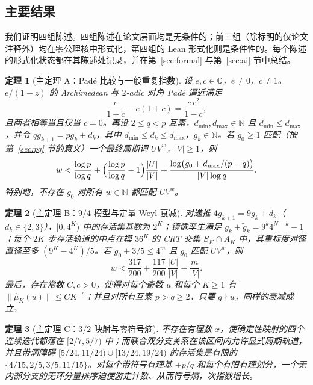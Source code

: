 \documentclass[11pt,a4paper]{article}
\newtheorem{theorem}{定理}[section]
\theoremstyle{remark}
\newcommand{\Q}{\mathbb{Q}}
\newcommand{\N}{\mathbb{N}}
\begin{document}
\subsection{主要结果}

我们证明四组陈述。四组陈述在论文层面均是无条件的；前三组（除标明的仅论文注释外）均在零公理核中形式化，第四组的 Lean 形式化则是条件性的。每个陈述的形式化状态都在其陈述处记录，并在第~\ref{sec:formal} 与第~\ref{sec:ai} 节中总结。

\begin{theorem}[主定理 A：Pad\'e 比较与一般重复指数]
\label{thm:mainA}
设 $e, c \in \Q$，$e \neq 0$，$c \neq 1$。$e/(1-z)$ 的 Archimedean 与 $2$-adic 对角 Pad\'e 逼近满足
\[
  \frac{e}{1-c} - e(1+c) = \frac{e\,c^{2}}{1-c},
\]
且两者相等当且仅当 $c = 0$。再设 $2 \le q < p$ 互素，$d_{\min}, d_{\max} \in \N$ 且 $d_{\min} \le d_{\max}$，并令 $q g_{k+1} = p g_{k} + d_{k}$，其中 $d_{\min} \le d_{k} \le d_{\max}$，$g_{k} \in \N$。若 $g_{0} \ge 1$ 匹配（按第~\ref{sec:pq} 节的意义）一个最终周期词 $U V^{w}$，$|V| \ge 1$，则
\[
  w < \frac{\log p}{\log q} + \Bigl(\frac{\log p}{\log q} - 1\Bigr)\frac{|U|}{|V|}
      + \frac{\log\bigl(g_{0} + d_{\max}/(p-q)\bigr)}{|V| \log q}.
\]
特别地，不存在 $g_{0}$ 对所有 $w \in \N$ 都匹配 $U V^{w}$。
\end{theorem}

\begin{theorem}[主定理 B：$9/4$ 模型与定量 Weyl 衰减]
\label{thm:mainB}
对递推 $4 g_{k+1} = 9 g_{k} + d_{k}$（$d_{k} \in \{2,3\}$），$[0,4^{K})$ 中的存活集基数为 $2^{K}$；镜像孪生满足 $g_{k} + \tilde g_{k} = 9^{k} 4^{N-k} - 1$；每个 $2K$ 步存活轨道的中点在模 $36^{K}$ 的 CRT 交集 $S_{K} \cap A_{K}$ 中，其重标度对径直径至多 $(9^{K} - 4^{K})/5$。若 $g_{0} + 3/5 \le 4^{m}$ 且 $g_{0}$ 匹配 $U V^{w}$，则
\[
  w < \frac{317}{200} + \frac{117}{200}\,\frac{|U|}{|V|} + \frac{m}{|V|}.
\]
最后，存在常数 $C, c > 0$，使得对每个奇数 $u$ 和每个 $K \ge 1$ 有 $\|\hat\mu_{K}(u)\| \le C K^{-c}$；并且对所有互素 $p > q \ge 2$，只要 $q \nmid u$，同样的衰减成立。
\end{theorem}

\begin{theorem}[主定理 C：$3/2$ 映射与零符号熵]
\label{thm:mainC}
不存在有理数 $x$，使确定性映射的四个连续迭代都落在 $[2/7,5/7)$ 中；而联合双分支关系在该区间内允许显式周期轨道，并且带洞障碍 $[5/24,11/24) \cup [13/24,19/24)$ 的存活集是有限的 $\{4/15, 2/5, 3/5, 11/15\}$。对每个带符号有理基 $\pm p/q$ 和每个有限有理划分，一个无内部分支的无环分量排序迫使游走计数、从而符号熵，次指数增长。
\end{theorem}
\end{document}

